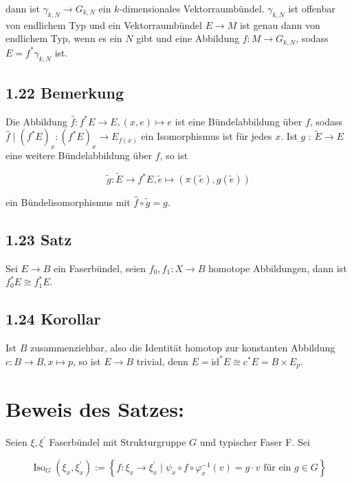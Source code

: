 \documentclass[10pt, letterpaper]{article}
\begin{document}
dann ist $\gamma_{k, N} \rightarrow G_{k, N}$ ein $k$-dimensionales Vektorraumbündel. $\gamma_{k, N}$ ist offenbar von endlichem Typ und ein Vektorraumbündel $E \rightarrow M$ ist genau dann von endlichem Typ, wenn es ein $N$ gibt und eine Abbildung $f: M \rightarrow G_{k, N}$, sodass $E=f^{*} \gamma_{k, N}$ ist.

\subsection*{1.22 Bemerkung}
Die Abbildung $\hat{f}: f^{*} E \rightarrow E,(x, e) \mapsto e$ ist eine Bündelabbildung über $f$, sodass $\hat{f} \mid\left(f^{*} E\right)_{x}:\left(f^{*} E\right)_{x} \rightarrow E_{f(x)}$ ein Isomorphismus ist für jedes $x$. Ist $g$ : $\widetilde{E} \rightarrow E$ eine weitere Bündelabbildung über $f$, so ist

$$
\tilde{g}: \widetilde{E} \rightarrow f^{*} E, \tilde{e} \mapsto(\pi(\tilde{e}), g(\tilde{e}))
$$

ein Bündelisomorphismus mit $\hat{f} \circ \tilde{g}=g$.

\subsection*{1.23 Satz}
Sei $E \rightarrow B$ ein Faserbündel, seien $f_{0}, f_{1}: X \rightarrow B$ homotope Abbildungen, dann ist $f_{0}^{*} E \cong f_{1}^{*} E$.

\subsection*{1.24 Korollar}
Ist $B$ zusammenziehbar, also die Identität homotop zur konstanten Abbildung $c: B \rightarrow B, x \mapsto p$, so ist $E \rightarrow B$ trivial, denn $E=\mathrm{id}^{*} E \cong c^{*} E=B \times E_{p}$.

\section*{Beweis des Satzes:}
Seien $\xi, \xi^{\prime}$ Faserbündel mit Strukturgruppe $G$ und typischer Faser F. Sei

$$
\operatorname{Iso}_{G}\left(\xi_{x}, \xi_{x}^{\prime}\right):=\left\{f: \xi_{x} \rightarrow \xi_{x}^{\prime} \mid \psi_{x} \circ f \circ \varphi_{x}^{-1}(v)=g \cdot v \text { für ein } g \in G\right\}
$$
\end{document}
